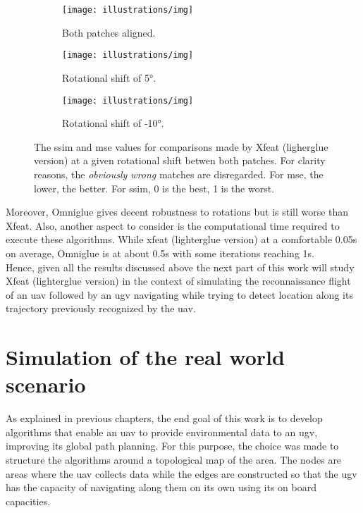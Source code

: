 \begin{figure}[ht!]
    \centering
    \begin{subfigure}[t]{0.32\textwidth}
        \texttt{[image: illustrations/img]}
        \caption{Both patches aligned.}
        \label{fig:find_corr:small_angles:mse_ssim_xfeat+lg_0} %
    \end{subfigure}
    \hfill
    \begin{subfigure}[t]{0.32\textwidth}
        \texttt{[image: illustrations/img]}
        \caption{Rotational shift of 5°.}
        \label{fig:find_corr:small_angles:mse_ssim_xfeat+lg_5}
    \end{subfigure}
    \hfill
    \begin{subfigure}[t]{0.32\textwidth}
        \texttt{[image: illustrations/img]}
        \caption{Rotational shift of -10°.}
        \label{fig:find_corr:small_angles:mse_ssim_xfeat+lg_-10}
    \end{subfigure}
    \caption{The \gls{ssim} and \gls{mse} values for comparisons made by Xfeat (ligherglue version) at a given rotational shift betwen both patches.
    For clarity reasons, the \textit{obviously wrong} matches are disregarded.
    For \gls{mse}, the lower, the better. For \gls{ssim}, 0 is the best, 1 is the worst.}
    \label{fig:find_corr:small_angles:mse_ssim}
\end{figure}

Moreover, Omniglue gives decent robustness to rotations but is still worse than Xfeat.
Also, another aspect to consider is the computational time required to execute these algorithms.
While xfeat (lighterglue version) at a comfortable 0.05s on average, Omniglue is at about 0.5s with some iterations reaching
1s.\\ %
Hence, given all the results discussed above the next part of this work will study Xfeat (lighterglue version) in the context of simulating
the reconnaissance flight of an \gls{uav} followed by an \gls{ugv} navigating while trying to detect location along its trajectory previously
recognized by the \gls{uav}.


\section{Simulation of the real world scenario}

As explained in previous chapters, the end goal of this work is to develop algorithms that enable an \gls{uav} to
provide environmental data to an \gls{ugv}, improving its global path planning.
For this purpose, the choice was made to structure the algorithms around a topological map of the area.
The nodes are areas where the \gls{uav} collects data while the edges are constructed so that the \gls{ugv}
has the capacity of navigating along them on its own using its on board capacities.

